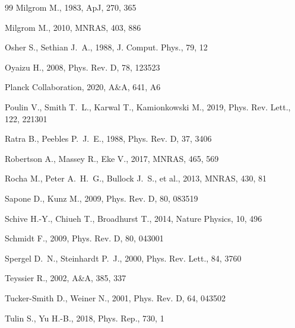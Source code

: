 \documentclass[11pt,a4paper]{article}
\begin{document}
\begin{thebibliography}{99}
Milgrom M., 1983, ApJ, 270, 365

Milgrom M., 2010, MNRAS, 403, 886

Osher S., Sethian J.~A., 1988, J. Comput. Phys., 79, 12

Oyaizu H., 2008, Phys. Rev. D, 78, 123523

Planck Collaboration, 2020, A\&A, 641, A6

Poulin V., Smith T.~L., Karwal T., Kamionkowski M., 2019, Phys. Rev. Lett., 122, 221301

Ratra B., Peebles P.~J.~E., 1988, Phys. Rev. D, 37, 3406

Robertson A., Massey R., Eke V., 2017, MNRAS, 465, 569

Rocha M., Peter A.~H.~G., Bullock J.~S., et al., 2013, MNRAS, 430, 81

Sapone D., Kunz M., 2009, Phys. Rev. D, 80, 083519

Schive H.-Y., Chiueh T., Broadhurst T., 2014, Nature Physics, 10, 496

Schmidt F., 2009, Phys. Rev. D, 80, 043001

Spergel D.~N., Steinhardt P.~J., 2000, Phys. Rev. Lett., 84, 3760

Teyssier R., 2002, A\&A, 385, 337

Tucker-Smith D., Weiner N., 2001, Phys. Rev. D, 64, 043502

Tulin S., Yu H.-B., 2018, Phys. Rep., 730, 1


\end{thebibliography}
\end{document}
